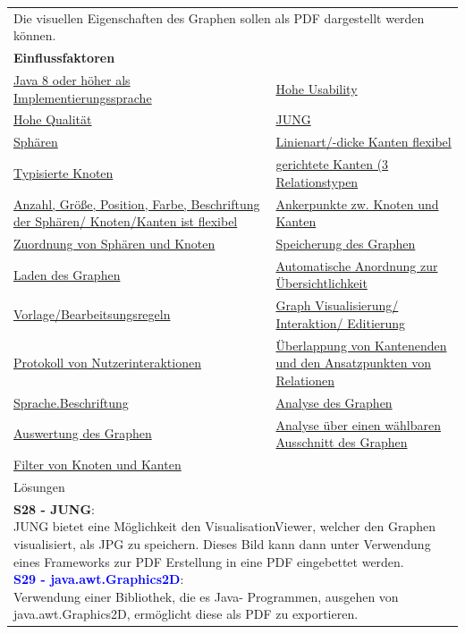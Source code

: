 \documentclass[enabledeprecatedfontcommands,fontsize=11pt,paper=a4,twoside]{scrartcl}
\newcounter{one}
\newcommand{\cb}[1]{{\textcolor{blue}{#1}}}
\begin{document}
\begin{tabular} {|p{8cm} p{8cm}|}
	\hline
	\rowcolor{prob}\multicolumn{2}{|l|}{\parbox{16cm}{\textbf{10: PDF Erstellung}}} \\  \hline\hline 
	\multicolumn{2}{|l|}{\parbox{16cm}{Die visuellen Eigenschaften des Graphen sollen als PDF dargestellt werden können.}}\rule{0pt}{1ex}\\ [1ex] \hline
	\multicolumn{2}{|l|}{\textbf{Einflussfaktoren}}\\
	\hyperlink{b}{Java 8 oder höher als Implementierungssprache} &  
	\hyperlink {g}{Hohe Usability}\\
	\hyperlink {h}{Hohe Qualität} &
	\hyperlink {k}{JUNG} \\
	\hyperlink {n}{Sphären} &
	\hyperlink {o}{Linienart/-dicke Kanten flexibel}\\
	\hyperlink {p}{Typisierte Knoten} &
	\hyperlink {q}{gerichtete Kanten (3 Relationstypen} \\
	\hyperlink {r}{Anzahl, Größe, Position, Farbe, Beschriftung der Sphären/ Knoten/Kanten ist flexibel} &
	\hyperlink {s}{Ankerpunkte zw. Knoten und Kanten} \\
	\hyperlink {t}{Zuordnung von Sphären und Knoten} &
	\hyperlink {v}{Speicherung des Graphen} \\
	\hyperlink {w}{Laden des Graphen} &
	\hyperlink {x}{Automatische Anordnung zur Übersichtlichkeit} \\
	\hyperlink {y}{Vorlage/Bearbeitsungsregeln} &
	\hyperlink {aa}{Graph Visualisierung/ Interaktion/ Editierung}\\
	\hyperlink {bb}{Protokoll von Nutzerinteraktionen} &
	\hyperlink {cc}{Überlappung von Kantenenden und den Ansatzpunkten von Relationen} \\
	\hyperlink {hh}{Sprache.Beschriftung} &
	\hyperlink {oo}{Analyse des Graphen} \\
	\hyperlink {pp}{Auswertung des Graphen} &
	\hyperlink {rr}{Analyse über einen wählbaren Ausschnitt des Graphen} \\ 
	\hyperlink {ss}{Filter von Knoten und Kanten} 
	\\ \hline
	\multicolumn{2}{|l|}{Lösungen} \\
	\multicolumn{2}{|l|}{\parbox{16cm}{
			\textbf{S28 - JUNG}: \\
			JUNG bietet eine Möglichkeit den VisualisationViewer, welcher den Graphen visualisiert, als JPG zu speichern. Dieses Bild kann dann unter Verwendung eines Frameworks zur PDF Erstellung in eine PDF eingebettet werden. \\
			\textbf{\cb{\hypertarget{hhh}{S29 - java.awt.Graphics2D}}}: \\
			Verwendung einer Bibliothek, die es Java- Programmen, ausgehen von java.awt.Graphics2D, ermöglicht diese als PDF zu exportieren. \\
	} }\\ [4ex] \hline
\end{tabular}\\ \\ \\
\end{document}
